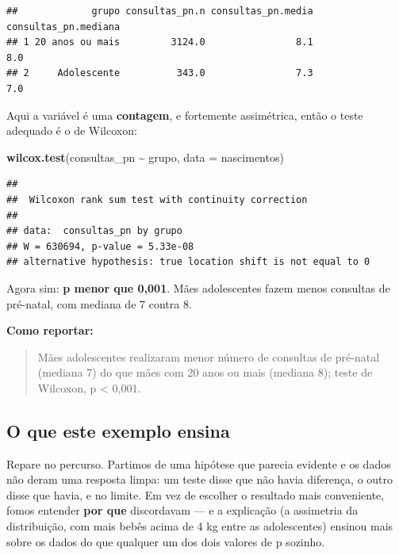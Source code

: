 \documentclass[
]{book}
\newenvironment{Shaded}{\begin{snugshade}}{\end{snugshade}}
\newcommand{\AttributeTok}[1]{\textcolor[rgb]{0.13,0.29,0.53}{#1}}
\newcommand{\FunctionTok}[1]{\textcolor[rgb]{0.13,0.29,0.53}{\textbf{#1}}}
\newcommand{\NormalTok}[1]{#1}
\newcommand{\SpecialCharTok}[1]{\textcolor[rgb]{0.81,0.36,0.00}{\textbf{#1}}}
\begin{document}
\begin{verbatim}
##             grupo consultas_pn.n consultas_pn.media consultas_pn.mediana
## 1 20 anos ou mais         3124.0                8.1                  8.0
## 2     Adolescente          343.0                7.3                  7.0
\end{verbatim}

Aqui a variável é uma \textbf{contagem}, e fortemente assimétrica, então o teste adequado é o de Wilcoxon:

\begin{Shaded}
\begin{Highlighting}[]
\FunctionTok{wilcox.test}\NormalTok{(consultas\_pn }\SpecialCharTok{\textasciitilde{}}\NormalTok{ grupo, }\AttributeTok{data =}\NormalTok{ nascimentos)}
\end{Highlighting}
\end{Shaded}

\begin{verbatim}
## 
##  Wilcoxon rank sum test with continuity correction
## 
## data:  consultas_pn by grupo
## W = 630694, p-value = 5.33e-08
## alternative hypothesis: true location shift is not equal to 0
\end{verbatim}

Agora sim: \textbf{p menor que 0,001}. Mães adolescentes fazem menos consultas de pré-natal, com mediana de 7 contra 8.

\textbf{Como reportar:}

\begin{quote}
Mães adolescentes realizaram menor número de consultas de pré-natal (mediana 7) do que mães com 20 anos ou mais (mediana 8); teste de Wilcoxon, p \textless{} 0,001.
\end{quote}

\subsection{O que este exemplo ensina}\label{o-que-este-exemplo-ensina}

Repare no percurso. Partimos de uma hipótese que parecia evidente e os dados não deram uma resposta limpa: um teste disse que não havia diferença, o outro disse que havia, e no limite. Em vez de escolher o resultado mais conveniente, fomos entender \textbf{por que} discordavam --- e a explicação (a assimetria da distribuição, com mais bebês acima de 4 kg entre as adolescentes) ensinou mais sobre os dados do que qualquer um dos dois valores de p sozinho.
\end{document}
